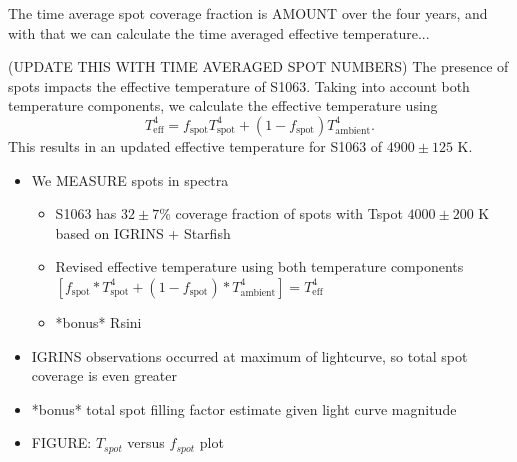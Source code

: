 \documentclass[twocolumn]{emulateapj}%
\begin{document}
The time average spot coverage fraction is AMOUNT over the four years, and with that we can calculate the time averaged effective temperature...

(UPDATE THIS WITH TIME AVERAGED SPOT NUMBERS) The presence of spots impacts the effective temperature of S1063. Taking into account both temperature components, we calculate the effective temperature using
\begin{equation}
T_{\textrm{eff}}^4 = f_{\textrm{spot}} T_{\textrm{spot}}^4 + (1 -f_{\textrm{spot}}) T_{\textrm{ambient}}^4 .
\end{equation}
This results in an updated effective temperature for S1063 of $4900\pm125$ K.



\begin{itemize}
\item We MEASURE spots in spectra
\begin{itemize}
  \item S1063 has $32 \pm 7$\% coverage fraction of spots with Tspot $4000\pm200$ K based on IGRINS + Starfish
  \item Revised effective temperature using both temperature components $[f_{\textrm{spot}} * T_{\textrm{spot}}^4 + (1 -f_{\textrm{spot}}) * T_{\textrm{ambient}}^4] = T_{\textrm{eff}}^4$

  \item *bonus* Rsini
\end{itemize}
\item IGRINS observations occurred at maximum of lightcurve, so total spot coverage is even greater
\item *bonus* total spot filling factor estimate given light curve magnitude
\item FIGURE: $T_{spot}$ versus $f_{spot}$ plot



\end{itemize}
\end{document}
